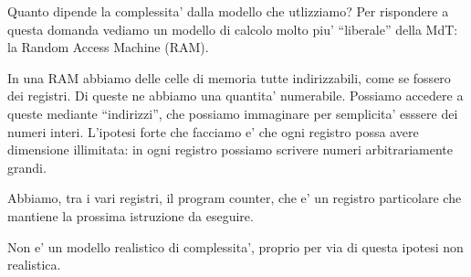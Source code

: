 Quanto dipende la complessita' dalla modello che utlizziamo? Per rispondere a questa domanda vediamo
un modello di calcolo molto piu' ``liberale'' della MdT: la Random Access Machine (RAM).

In una RAM abbiamo delle celle di memoria tutte indirizzabili, come se fossero dei registri. Di
queste ne abbiamo una quantita' numerabile. Possiamo accedere a queste mediante ``indirizzi'', che
possiamo immaginare per semplicita' esssere dei numeri interi. L'ipotesi forte che facciamo e' che
ogni registro possa avere dimensione illimitata: in ogni registro possiamo scrivere numeri
arbitrariamente grandi.

Abbiamo, tra i vari registri, il program counter, che e' un registro particolare che mantiene la
prossima istruzione da eseguire.

Non e' un modello realistico di complessita', proprio per via di questa ipotesi non realistica.


